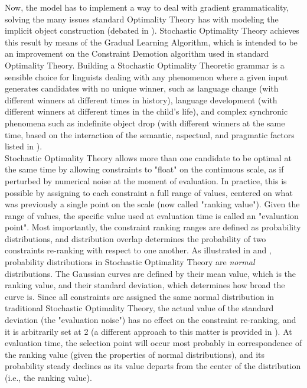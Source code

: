 Now, the model has to implement a way to deal with gradient grammaticality, solving the many issues standard Optimality Theory has with modeling the implicit object construction (debated in ). Stochastic Optimality Theory achieves this result by means of the Gradual Learning Algorithm, which is intended to be an improvement on the Constraint Demotion algorithm \parencite{TesarSmolensky1993learnability} used in standard Optimality Theory. Building a Stochastic Optimality Theoretic grammar is a sensible choice for linguists dealing with any phenomenon where a given input generates candidates with no unique winner, such as language change (with different winners at different times in history), language development (with different winners at different times in the child's life), and complex synchronic phenomena such as indefinite object drop (with different winners at the same time, based on the interaction of the semantic, aspectual, and pragmatic factors listed in ).\\
Stochastic Optimality Theory allows more than one candidate to be optimal at the same time by allowing constraints to "float" on the continuous scale, as if perturbed by numerical noise at the moment of evaluation. In practice, this is possible by assigning to each constraint a full range of values, centered on what was previously a single point on the scale (now called "ranking value"). Given the range of values, the specific value used at evaluation time is called an "evaluation point". Most importantly, the constraint ranking ranges are defined as probability distributions, and distribution overlap determines the probability of two constraints re-ranking with respect to one another. As illustrated in  and , probability distributions in Stochastic Optimality Theory are \textit{normal} distributions. The Gaussian curves are defined by their mean value, which is the ranking value, and their standard deviation, which determines how broad the curve is. Since all constraints are assigned the same normal distribution in traditional Stochastic Optimality Theory, the actual value of the standard deviation (the "evaluation noise") has no effect on the constraint re-ranking, and it is arbitrarily set at 2 (a different approach to this matter is provided in \textcite{reynolds1994variation, nagy1997optimality}). At evaluation time, the selection point will occur most probably in correspondence of the ranking value (given the properties of normal distributions), and its probability steady declines as its value departs from the center of the distribution (i.e., the ranking value).\\
